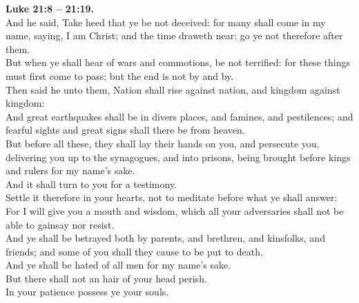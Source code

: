 \documentclass[10pt]{article} %
\begin{document}
{\begin{minipage}[t]{0.45\textwidth}
\textbf{Luke 21:8 -- 21:19.}\\
And he said, Take heed that ye be not deceived: for many shall come in my name, saying, I am Christ; and the time draweth near: go ye not therefore after them.\\
But when ye shall hear of wars and commotions, be not terrified: for these things must first come to pass; but the end is not by and by.\\
Then said he unto them, Nation shall rise against nation, and kingdom against kingdom:\\
And great earthquakes shall be in divers places, and famines, and pestilences; and fearful sights and great signs shall there be from heaven.\\
But before all these, they shall lay their hands on you, and persecute you, delivering you up to the synagogues, and into prisons, being brought before kings and rulers for my name's sake.\\
And it shall turn to you for a testimony.\\
Settle it therefore in your hearts, not to meditate before what ye shall answer:\\
For I will give you a mouth and wisdom, which all your adversaries shall not be able to gainsay nor resist.\\
And ye shall be betrayed both by parents, and brethren, and kinsfolks, and friends; and some of you shall they cause to be put to death.\\
And ye shall be hated of all men for my name's sake.\\
But there shall not an hair of your head perish.\\
In your patience possess ye your souls.\\

\end{minipage}}
\vspace*{\fill}
\newpage
\Huge%
\vspace*{\fill}
\end{document}
